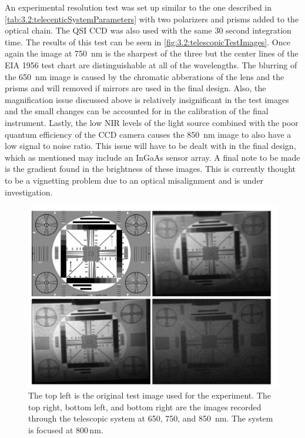 An experimental resolution test was set up similar to the one described in \autoref{tab:3.2:telecenticSystemParameters} with two polarizers and prisms added to the optical chain. The QSI CCD was also used with the same 30 second integration time. The results of this test can be seen in \autoref{fig:3.2:telescopicTestImages}. Once again the image at 750~nm is the sharpest of the three but the center lines of the EIA 1956 test chart are distinguishable at all of the wavelengths. The blurring of the 650~nm image is caused by the chromatic abberations of the lens and the prisms and will removed if mirrors are used in the final design. Also, the magnification issue discussed above is relatively insignificant in the test images and the small changes can be accounted for in the calibration of the final instrument. Lastly, the low NIR levels of the light source combined with the poor quantum efficiency of the CCD camera causes the 850~nm image to also have a low signal to noise ratio. This issue will have to be dealt with in the final design, which as mentioned may include an InGaAs sensor array. A final note to be made is the gradient found in the brightness of these images. This is currently thought to be a vignetting problem due to an optical misalignment and is under investigation.

\begin{figure}[h!]
    \begin{center}
    \includegraphics[width=1.0\textwidth]{./Images/3-2-TelescopicTestImages.pdf}
    \caption[Telescoptic Prototype Laboratory Test Images]{The top left is the original test image used for the experiment. The top right, bottom left, and bottom right are the images recorded through the telescopic system at 650, 750, and 850~nm. The system is focused at 800\,nm.}
   \label{fig:3.2:telescopicTestImages}
    \end{center}
\end{figure}

